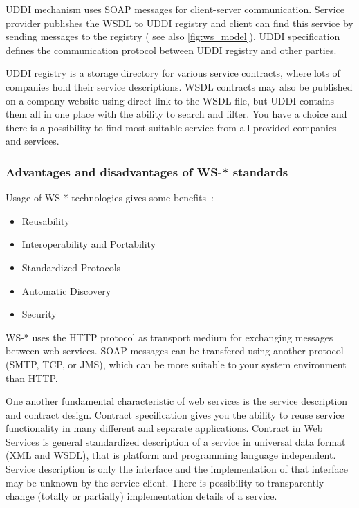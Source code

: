 \gls{UDDI} mechanism uses \gls{SOAP} messages for client-server communication. 
Service provider publishes the \gls{WSDL} to \gls{UDDI} registry and client can
find this service by sending messages to the registry ( see also 
\autoref{fig:ws_model}). \gls{UDDI} specification defines the communication
protocol between \gls{UDDI} registry and other parties.


\gls{UDDI} registry is a storage directory for various service contracts, where
lots of companies hold their service descriptions. \gls{WSDL} contracts may 
also be published on a company website using direct link to the \gls{WSDL} file,
but \gls{UDDI} contains them all in one place with the ability to search and
filter.
You have a choice and there is a possibility to find most suitable service
from all provided companies and services.



\subsubsection{Advantages and disadvantages of WS-* standards}
\label{sec:adv_and_disadv_of_ws_standards}
Usage of WS-* technologies gives some
benefits~\cite{ws_techologies_state_of_the_art}:

\begin{itemize}
  \item Reusability
  \item Interoperability and Portability
  \item Standardized Protocols
  \item Automatic Discovery
  \item Security
\end{itemize}

WS-* uses the \gls{HTTP} protocol as transport medium for exchanging messages
between web services. \gls{SOAP} messages can be transfered using another
protocol (\gls{SMTP}, \gls{TCP}, or \gls{JMS}), which can be more suitable to
your system environment than \gls{HTTP}.

One another fundamental characteristic of web services is the service
description and contract design. Contract specification gives you the ability to
reuse service functionality in many different and separate applications.
Contract in Web Services is general standardized description of a service in
universal data format (\gls{XML} and \gls{WSDL}), that is platform and programming language
independent. Service description is only the interface and the implementation
of that interface may be unknown by the service client. There is possibility to
transparently change (totally or partially) implementation details of a service.


